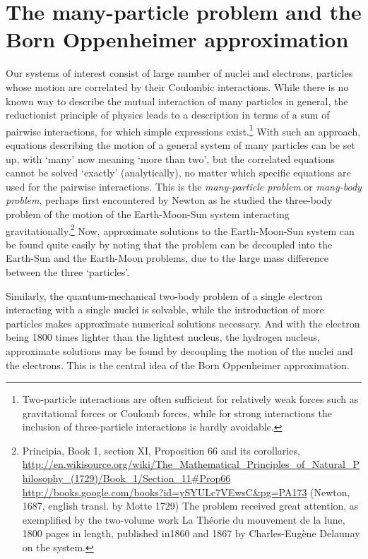 \documentclass[11pt,bibliography=totoc,index=totoc]{scrbook}   %
\begin{document}
%
\section{The many-particle problem and the Born Oppenheimer approximation}\label{sec:born-oppenheimer}
%

Our systems of interest consist of large number of nuclei and electrons, particles whose motion are correlated by their Coulombic interactions. 
While there is no known way to describe the mutual interaction of many particles in general, 
the reductionist principle of physics leads to a description in terms of a sum of pairwise interactions, for which simple expressions exist.\footnote{
Two-particle interactions are often sufficient for relatively weak forces such as gravitational forces or Coulomb forces, 
while for strong interactions the inclusion of three-particle interactions is hardly avoidable.\cite{Lovelace:1964}}
With such an approach, equations describing the motion of a general system of many particles can be set up, 
with `many' now meaning `more than two',
but the correlated equations cannot be solved `exactly' (analytically), 
no matter which specific equations are used for the pairwise interactions.
This is the \emph{many-particle problem} or \emph{many-body problem}, perhaps first encountered by Newton as he studied the three-body problem of the motion of the Earth-Moon-Sun system interacting gravitationally.\footnote{Principia, Book 1, section XI, Proposition 66 and its corollaries,
\url{http://en.wikisource.org/wiki/The_Mathematical_Principles_of_Natural_Philosophy_(1729)/Book_1/Section_11\#Prop66}
\url{http://books.google.com/books?id=ySYULc7VEwsC&pg=PA173}
(Newton, 1687, english transl. by Motte 1729) 
The problem received great attention, as exemplified by the two-volume work La Théorie du mouvement de la lune, 1800 pages in length, published in1860 and 1867 by Charles-Eugène Delaunay on the system.}
Now, approximate solutions to the Earth-Moon-Sun system can be found quite easily by noting that 
the problem can be decoupled into the Earth-Sun and the Earth-Moon problems, due to the large mass difference between the three `particles'.

Similarly, the quantum-mechanical two-body problem of a single electron interacting with a single nuclei is solvable, while the introduction of more particles makes approximate numerical solutions necessary. 
And with the electron being 1800 times lighter than the lightest nucleus, the hydrogen nucleus, approximate solutions may be found by decoupling the motion of the nuclei and the electrons. 
This is the central idea of the Born Oppenheimer approximation\cite{BO:1927}.
\end{document}
